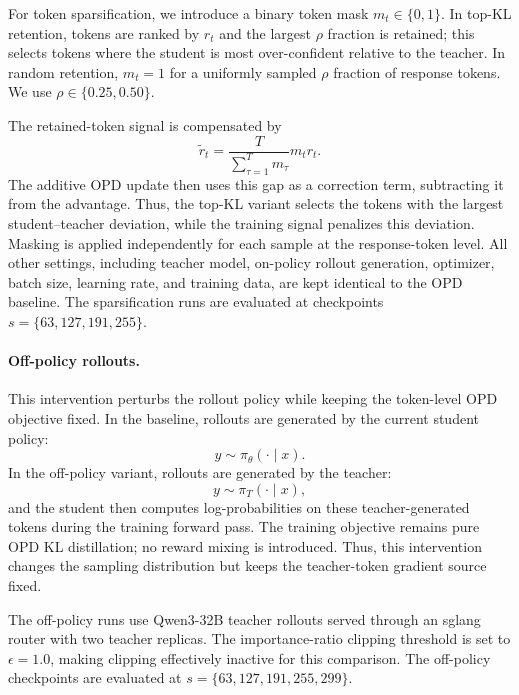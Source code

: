 \documentclass{llmxive}
\begin{document}
For token sparsification, we introduce a binary token mask
$m_t\in\{0,1\}$. In top-KL retention, tokens are ranked by $r_t$ and the
largest $\rho$ fraction is retained; this selects tokens where the student
is most over-confident relative to the teacher. In random retention,
$m_t=1$ for a uniformly sampled $\rho$ fraction of response tokens. We use
$\rho\in\{0.25,0.50\}$.

The retained-token signal is compensated by
\[
    \widetilde{r}_t
    =
    \frac{T}{\sum_{\tau=1}^{T}m_\tau}
    m_t r_t .
    \label{eq:masked-opd-signal}
\]
The additive OPD update then uses this gap as a correction term, subtracting
it from the advantage. Thus, the top-KL variant selects the tokens with the
largest student--teacher deviation, while the training signal penalizes this
deviation. Masking is applied independently for each sample at the
response-token level. All other settings, including teacher model,
on-policy rollout generation, optimizer, batch size, learning rate, and
training data, are kept identical to the OPD baseline. The sparsification
runs are evaluated at checkpoints $s=\{63,127,191,255\}$.

\paragraph{Off-policy rollouts.}
This intervention perturbs the rollout policy while keeping the token-level
OPD objective fixed. In the baseline, rollouts are generated by the current
student policy:
\[
    y \sim \pi_\theta(\cdot\mid x).
\]
In the off-policy variant, rollouts are generated by the teacher:
\[
    y \sim \pi_T(\cdot\mid x),
\]
and the student then computes log-probabilities on these teacher-generated
tokens during the training forward pass. The training objective remains pure
OPD KL distillation; no reward mixing is introduced. Thus, this intervention
changes the sampling distribution but keeps the teacher-token gradient
source fixed.

The off-policy runs use Qwen3-32B teacher rollouts served through an sglang
router with two teacher replicas. The importance-ratio clipping threshold
is set to $\epsilon=1.0$, making clipping effectively inactive for this
comparison. The off-policy checkpoints are evaluated at
$s=\{63,127,191,255,299\}$.
\end{document}
